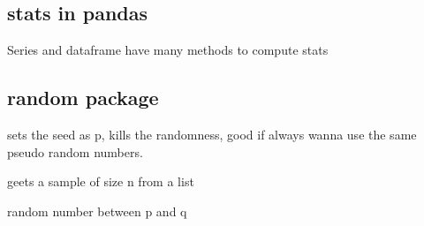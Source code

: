 	\subsection{stats in pandas}
		
		Series and dataframe have many methods to compute stats







	\subsection{random package}


		 sets the seed as p, kills the randomness, good if always wanna use the same pseudo random numbers.

		 geets a sample of size n from a list

		 random number between p and q




